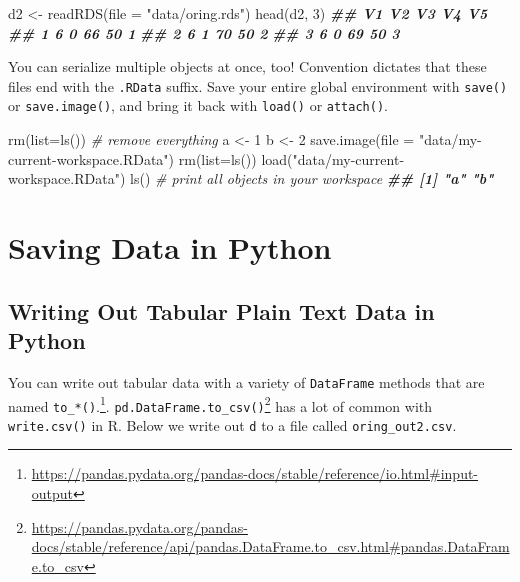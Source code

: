 \documentclass[
  12pt,
  krantz2]{krantz}
\makeatletter
\newenvironment{Shaded}{\begin{snugshade}}{\end{snugshade}}
\newcommand{\AttributeTok}[1]{\textcolor[rgb]{0.61,0.61,0.61}{#1}}
\newcommand{\CommentTok}[1]{\textcolor[rgb]{0.37,0.37,0.37}{\textit{#1}}}
\newcommand{\DecValTok}[1]{\textcolor[rgb]{0.06,0.06,0.06}{#1}}
\newcommand{\DocumentationTok}[1]{\textcolor[rgb]{0.37,0.37,0.37}{\textbf{\textit{#1}}}}
\newcommand{\FunctionTok}[1]{\textcolor[rgb]{0,0,0}{#1}}
\newcommand{\NormalTok}[1]{#1}
\newcommand{\OtherTok}[1]{\textcolor[rgb]{0.37,0.37,0.37}{#1}}
\newcommand{\StringTok}[1]{\textcolor[rgb]{0.5,0.5,0.5}{#1}}
\renewcommand{\href}[2]{#2\footnote{\url{#1}}}
\newenvironment{kframe}{%
\medskip{}
\setlength{\fboxsep}{.8em}
 \def\at@end@of@kframe{}%
 \ifinner\ifhmode%
  \def\at@end@of@kframe{\end{minipage}}%
  \begin{minipage}{\columnwidth}%
 \fi\fi%
 \def\FrameCommand##1{\hskip\@totalleftmargin \hskip-\fboxsep
 \colorbox{shadecolor}{##1}\hskip-\fboxsep
     \hskip-\linewidth \hskip-\@totalleftmargin \hskip\columnwidth}%
 \MakeFramed {\advance\hsize-\width
   \@totalleftmargin\z@ \linewidth\hsize
   \@setminipage}}%
 {\par\unskip\endMakeFramed%
 \at@end@of@kframe}
\renewenvironment{Shaded}{\begin{kframe}}{\end{kframe}}
\makeatother
\begin{document}
\begin{Shaded}
\begin{Highlighting}[]
\NormalTok{d2 }\OtherTok{\textless{}{-}} \FunctionTok{readRDS}\NormalTok{(}\AttributeTok{file =} \StringTok{"data/oring.rds"}\NormalTok{)}
\FunctionTok{head}\NormalTok{(d2, }\DecValTok{3}\NormalTok{)}
\DocumentationTok{\#\#   V1 V2 V3 V4 V5}
\DocumentationTok{\#\# 1  6  0 66 50  1}
\DocumentationTok{\#\# 2  6  1 70 50  2}
\DocumentationTok{\#\# 3  6  0 69 50  3}
\end{Highlighting}
\end{Shaded}

You can serialize multiple objects at once, too! Convention dictates that these files end with the \texttt{.RData} suffix. Save your entire global environment with \texttt{save()} or \texttt{save.image()}, and bring it back with \texttt{load()} or \texttt{attach()}.

\begin{Shaded}
\begin{Highlighting}[]
\FunctionTok{rm}\NormalTok{(}\AttributeTok{list=}\FunctionTok{ls}\NormalTok{()) }\CommentTok{\# remove everything}
\NormalTok{a }\OtherTok{\textless{}{-}} \DecValTok{1}
\NormalTok{b }\OtherTok{\textless{}{-}} \DecValTok{2}
\FunctionTok{save.image}\NormalTok{(}\AttributeTok{file =} \StringTok{"data/my{-}current{-}workspace.RData"}\NormalTok{)}
\FunctionTok{rm}\NormalTok{(}\AttributeTok{list=}\FunctionTok{ls}\NormalTok{()) }
\FunctionTok{load}\NormalTok{(}\StringTok{"data/my{-}current{-}workspace.RData"}\NormalTok{)}
\FunctionTok{ls}\NormalTok{() }\CommentTok{\# print all objects in your workspace}
\DocumentationTok{\#\# [1] "a" "b"}
\end{Highlighting}
\end{Shaded}

\hypertarget{saving-data-in-python}{%
\section{Saving Data in Python}\label{saving-data-in-python}}

\hypertarget{writing-out-tabular-plain-text-data-in-python}{%
\subsection{Writing Out Tabular Plain Text Data in Python}\label{writing-out-tabular-plain-text-data-in-python}}

You can write out tabular data with a variety of \href{https://pandas.pydata.org/pandas-docs/stable/reference/io.html\#input-output}{\texttt{DataFrame} methods that are named \texttt{to\_*()}.}. \href{https://pandas.pydata.org/pandas-docs/stable/reference/api/pandas.DataFrame.to_csv.html\#pandas.DataFrame.to_csv}{\texttt{pd.DataFrame.to\_csv()}} has a lot of common with \texttt{write.csv()} in R. Below we write out \texttt{d} to a file called \texttt{oring\_out2.csv}.
\end{document}
